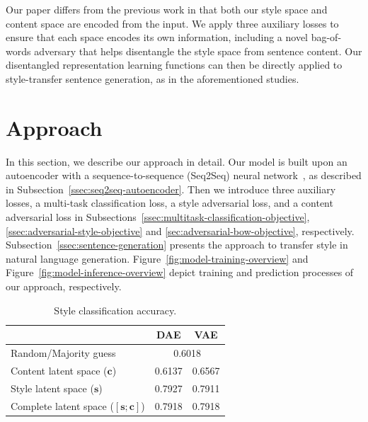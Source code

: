 \documentclass[11pt,a4paper]{article}
\newcommand{\tabh}[1]{\multicolumn{1}{c|}{\textbf{#1}}}
\begin{document}
Our paper differs from the previous work in that both our style space and content space are encoded from the input. We apply three auxiliary losses to ensure that each space encodes its own information, including a novel bag-of-words adversary that helps disentangle the style space from sentence content. Our disentangled representation learning functions can then be directly applied to style-transfer sentence generation, as in the aforementioned studies.


\section{Approach}

In this section, we describe our approach in detail. Our model is built upon an autoencoder with a sequence-to-sequence (Seq2Seq) neural network~\cite{sutskever2014sequence}, as described in Subsection~\ref{ssec:seq2seq-autoencoder}. Then we introduce three auxiliary losses, a multi-task classification loss, a style adversarial loss, and a content adversarial loss in Subsections~\ref{ssec:multitask-classification-objective}, \ref{ssec:adversarial-style-objective} and \ref{sec:adversarial-bow-objective}, respectively. Subsection~\ref{ssec:sentence-generation} presents the approach to transfer style in natural language generation. Figure~\ref{fig:model-training-overview} and Figure~\ref{fig:model-inference-overview} depict training and prediction processes of our approach, respectively.

\begin{table}[ht]
	\centering
	\begin{tabular}{| l | r | r |}
		\hline
		                                        & \tabh{DAE}                  & \tabh{VAE} \\
		\hline \hline
		Random/Majority guess                   & \multicolumn{2}{c|}{0.6018}              \\ \hline \hline
		Content latent space  ($\bm c$)         & 0.6137                      & 0.6567     \\ \hline
		Style latent space ($\bm s$)            & 0.7927                      & 0.7911     \\ \hline
		Complete latent space ($[\bm s;\bm c]$) & 0.7918                      & 0.7918     \\
		\hline
	\end{tabular}
	\caption{Style classification accuracy.}
	\label{tab:classification}
\end{table}
\end{document}

